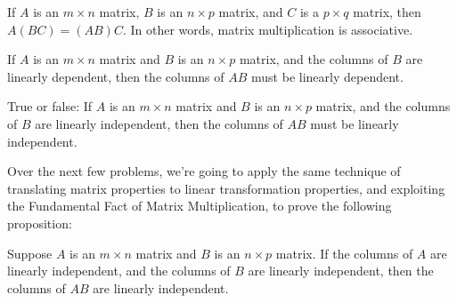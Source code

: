 


{}  
If $A$ is an $m\times n$ matrix, $B$ is an $n\times p$ matrix, and $C$ is a $p\times q$ matrix,
then $A(BC) = (AB)C$.  In other words, matrix multiplication is associative.  

\endedxtext


\endedxvertical








{}  
If $A$ is an $m\times n$ matrix and $B$ is an $n\times p$ matrix, and the columns of $B$ are
linearly dependent, then the columns of $AB$ must be linearly dependent. 

\endedxtext





     

True or false: If $A$ is an $m\times n$ matrix and $B$ is an $n\times p$ matrix, and the columns of $B$ are
linearly independent, then the columns of $AB$ must be linearly independent. 





\endedxproblem

\endedxvertical








Over the next few problems, we're going to apply the same 
technique of translating matrix properties to linear transformation properties, and exploiting the
Fundamental Fact of Matrix Multiplication, 
to prove the following proposition:

{}  
Suppose $A$ is an $m\times n$ matrix and $B$ is an $n\times p$ matrix. If the columns of $A$ are
linearly independent, and the columns of $B$ are linearly independent, then the columns of $AB$ are 
linearly independent. 


